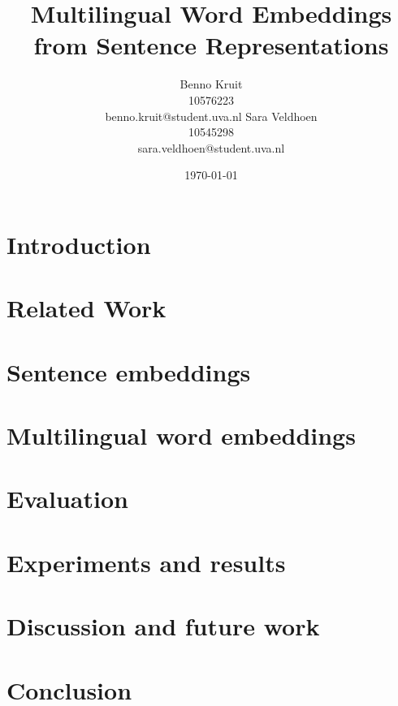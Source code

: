 \documentclass[11pt]{article}
\title{Multilingual Word Embeddings from Sentence Representations}
\author{Benno Kruit\\10576223\\benno.kruit@student.uva.nl\And
Sara Veldhoen\\10545298\\sara.veldhoen@student.uva.nl}
\date{\today}
\begin{document}
\maketitle



\section{Introduction}\label{s:introduction}

\section{Related Work}\label{s:relatedWork}

\section{Sentence embeddings}\label{s:sentenceEmbeddings}

\section{Multilingual word embeddings}\label{s:wordEmbeddings}

\section{Evaluation}\label{s:evaluation}

\section{Experiments and results}\label{s:experiments}

\section{Discussion and future work}\label{s:discussion}

\section{Conclusion}\label{s:conclusion}




\end{document}
